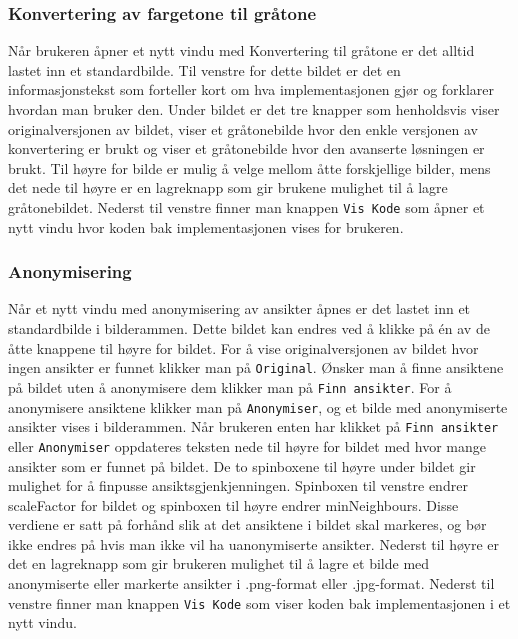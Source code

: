 \subsubsection{Konvertering av fargetone til gråtone}
Når brukeren åpner et nytt vindu med Konvertering til gråtone er det alltid lastet inn et standardbilde. Til venstre for dette bildet er det en informasjonstekst som forteller kort om hva implementasjonen gjør og forklarer hvordan man bruker den. Under bildet er det tre knapper som henholdsvis viser originalversjonen av bildet, viser et gråtonebilde hvor den enkle versjonen av konvertering er brukt og viser et gråtonebilde hvor den avanserte løsningen er brukt. Til høyre for bilde er mulig å velge mellom åtte forskjellige bilder, mens det nede til høyre er en lagreknapp som gir brukene mulighet til å lagre gråtonebildet. Nederst til venstre finner man knappen \texttt{Vis Kode} som åpner et nytt vindu hvor koden bak implementasjonen vises for brukeren.


\subsubsection{Anonymisering}
Når et nytt vindu med anonymisering av ansikter åpnes er det lastet inn et standardbilde i bilderammen. Dette bildet kan endres ved å klikke på én av de åtte knappene til høyre for bildet. For å vise originalversjonen av bildet hvor ingen ansikter er funnet klikker man på \texttt{Original}. Ønsker man å finne ansiktene på bildet uten å anonymisere dem klikker man på \texttt{Finn ansikter}. For å anonymisere ansiktene klikker man på \texttt{Anonymiser}, og et bilde med anonymiserte ansikter vises i bilderammen. Når brukeren enten har klikket på \texttt{Finn ansikter} eller \texttt{Anonymiser} oppdateres teksten nede til høyre for bildet med hvor mange ansikter som er funnet på bildet. De to spinboxene til høyre under bildet gir mulighet for å finpusse ansiktsgjenkjenningen. Spinboxen til venstre endrer scaleFactor for bildet og spinboxen til høyre endrer minNeighbours. Disse verdiene er satt på forhånd slik at det ansiktene i bildet skal markeres, og bør ikke endres på hvis man ikke vil ha uanonymiserte ansikter. Nederst til høyre er det en lagreknapp som gir brukeren mulighet til å lagre et bilde med anonymiserte eller markerte ansikter i .png-format eller .jpg-format. Nederst til venstre finner man knappen \texttt{Vis Kode} som viser koden bak implementasjonen i et nytt vindu. 

